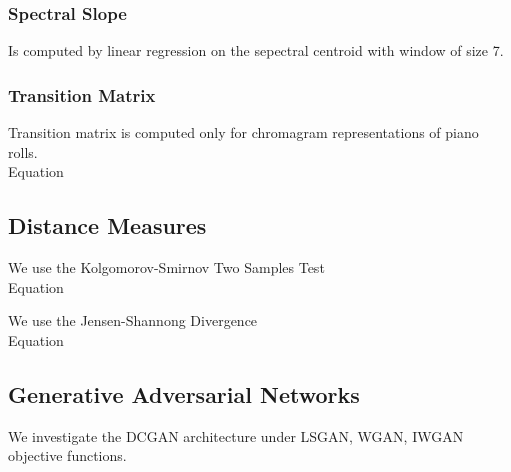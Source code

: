 \subsubsection{Spectral Slope}
Is computed by linear regression on the sepectral centroid with window of size
7.

\subsubsection{Transition Matrix}
Transition matrix is computed only for chromagram representations of piano
rolls. \\
Equation

\subsection{Distance Measures}
We use the Kolgomorov-Smirnov Two Samples Test\\
Equation

We use the Jensen-Shannong Divergence\\
Equation

\subsection{Generative Adversarial Networks}
We investigate the DCGAN architecture under LSGAN, WGAN, IWGAN objective
functions.
